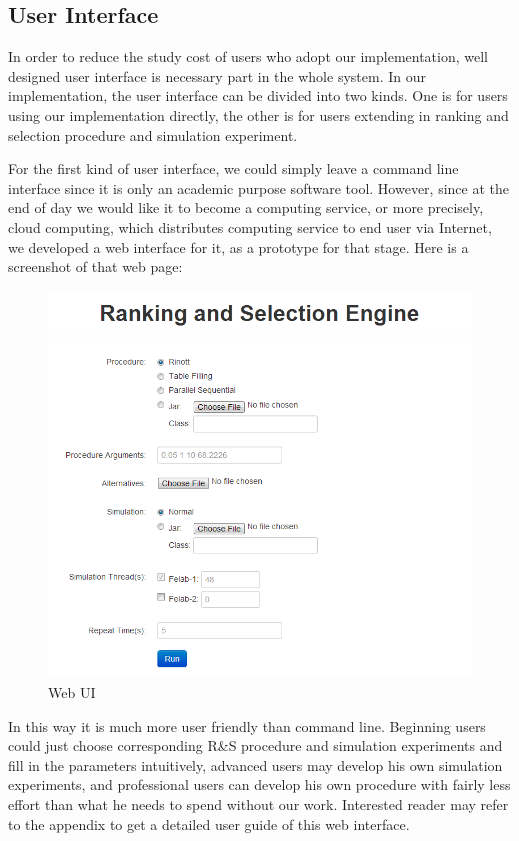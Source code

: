 \documentclass[12pt,a4]{report}
\begin{document}
\subsection{User Interface}

In order to reduce the study cost of users who adopt our implementation, well designed user interface is necessary part in the whole system. In our implementation, the user interface can be divided into two kinds. One is for users using our implementation directly, the other is for users extending in ranking and selection procedure and simulation experiment.

For the first kind of user interface, we could simply leave a command line interface since it is only an academic purpose software tool. However, since at the end of day we would like it to become a computing service, or more precisely, cloud computing, which distributes computing service to end user via Internet, we developed a web interface for it, as a prototype for that stage. Here is a screenshot of that web page:

\begin{figure}[ht]\label{web-ui}
\centering
\includegraphics[width=120mm]{rase_web.png}
\caption{Web UI}
\end{figure}

In this way it is much more user friendly than command line. Beginning users could just choose corresponding R\&S procedure and simulation experiments and fill in the parameters intuitively, advanced users may develop his own simulation experiments, and professional users can develop his own procedure with fairly less effort than what he needs to spend without our work. Interested reader may refer to the appendix to get a detailed user guide of this web interface.
\end{document}
